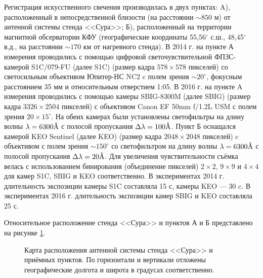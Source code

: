 \documentclass[12pt,a4paper]{article}
\newcommand{\angstrom}{\textup{\AA}}
\begin{document}
Регистрация искусственного свечения производилась в двух пунктах: A), расположенный в непосредственной близости (на расстоянии $\sim850$ м) от антенной системы стенда <<Сура>>; Б), расположенный на территории магнитной обсерватории КФУ (географические координаты 55,56$^{\circ}$ с.ш., 48,45$^{\circ}$ в.д., на расстоянии $\sim170$ км от нагревного стенда). В 2014 г. на пункте А измерения проводились с помощью цифровой светочувствительной ФПЗС-камерой S1C/079-FU (далее S1C) \cite{S1C_specs} (размер кадра $578\times578$ пикселей) со светосильным объективом Юпитер-НС NC2 \cite{NC2_specs} c полем зрения $\sim20^{\circ}$, фокусным расстоянием 35 мм и относительным отверстием 1:05. В 2016 г. на пункте A измерения проводились с помощью камеры SBIG-8300M (далее SBIG) \cite{SBIG_specs} (размер кадра $3326\times2504$ пикселей) с объективом Canon EF 50mm f/1.2L USM с полем зрения $20\times15^{\circ}$. На обеих камерах были установлены светофильтры на длину волны $\lambda=6300\angstrom$ с полосой пропускания $\Delta \lambda = 100\angstrom$. Пункт Б оснащался камерой KEO Sentinel (далее KEO) \cite{KEO_specs} (размер кадра $2048\times2048$ пикселей) c объективом с полем зрения $\sim150^{\circ}$ со светофильтром на длину волны $\lambda=6300\angstrom$ с полосой пропускания $\Delta \lambda = 20\angstrom$. 
Для увеличения чувствительности съёмка велась с использованием бинирования (объединение пикселей) $2\times2$, $9\times9$ и $4\times4$ для камер S1C, SBIG и KEO соответственно. В экспериментах 2014 г. длительность экспозиции камеры S1C составляла 15 с, камеры KEO --- 30 c. В экспериментах 2016 г. длительность экспозиции камер SBIG и KEO составляла 25 с.


Относительное расположение стенда <<Сура>> и пунктов А и Б представлено на рисунке \ref{fig:fig1}.



\begin{figure}[h]
	\caption{Карта расположения антенной системы стенда <<Сура>> и приёмных пунктов. По горизонтали и вертикали отложены географические долгота и широта в градусах соответственно.}
	\label{fig:fig1}
\end{figure}
\end{document}
